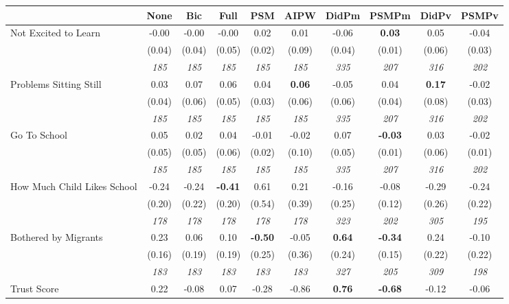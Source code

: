 \begin{tabular}{l c c c c c c c c c}
\toprule
 & None & Bic & Full & PSM & AIPW & DidPm & PSMPm & DidPv & PSMPv \\
\midrule
Not Excited to Learn & -0.00 & -0.00 & -0.00 & 0.02 & 0.01 & -0.06 & \textbf{0.03} & 0.05 & -0.04 \\
& (0.04) & (0.04) & (0.05) & (0.02) & (0.09) & (0.04) & (0.01) & (0.06) & (0.03) \\
& \textit{ 185 } & \textit{ 185 } & \textit{ 185 } & \textit{ 185 } & \textit{ 185 } & \textit{ 335 } & \textit{ 207 } & \textit{ 316 } & \textit{ 202 } \\
Problems Sitting Still & 0.03 & 0.07 & 0.06 & 0.04 & \textbf{0.06} & -0.05 & 0.04 & \textbf{ 0.17 } & -0.02 \\
& (0.04) & (0.06) & (0.05) & (0.03) & (0.06) & (0.06) & (0.04) & (0.08) & (0.03) \\
& \textit{ 185 } & \textit{ 185 } & \textit{ 185 } & \textit{ 185 } & \textit{ 185 } & \textit{ 335 } & \textit{ 207 } & \textit{ 316 } & \textit{ 202 } \\
Go To School & 0.05 & 0.02 & 0.04 & -0.01 & -0.02 & 0.07 & \textbf{-0.03} & 0.03 & -0.02 \\
& (0.05) & (0.05) & (0.06) & (0.02) & (0.10) & (0.05) & (0.01) & (0.06) & (0.01) \\
& \textit{ 185 } & \textit{ 185 } & \textit{ 185 } & \textit{ 185 } & \textit{ 185 } & \textit{ 335 } & \textit{ 207 } & \textit{ 316 } & \textit{ 202 } \\
How Much Child Likes School & -0.24 & -0.24 & \textbf{ -0.41 } & 0.61 & 0.21 & -0.16 & -0.08 & -0.29 & -0.24 \\
& (0.20) & (0.22) & (0.20) & (0.54) & (0.39) & (0.25) & (0.12) & (0.26) & (0.22) \\
& \textit{ 178 } & \textit{ 178 } & \textit{ 178 } & \textit{ 178 } & \textit{ 178 } & \textit{ 323 } & \textit{ 202 } & \textit{ 305 } & \textit{ 195 } \\
Bothered by Migrants & 0.23 & 0.06 & 0.10 & \textbf{-0.50} & -0.05 & \textbf{ 0.64 } & \textbf{-0.34} & 0.24 & -0.10 \\
& (0.16) & (0.19) & (0.19) & (0.25) & (0.36) & (0.24) & (0.15) & (0.22) & (0.22) \\
& \textit{ 183 } & \textit{ 183 } & \textit{ 183 } & \textit{ 183 } & \textit{ 183 } & \textit{ 327 } & \textit{ 205 } & \textit{ 309 } & \textit{ 198 } \\
Trust Score & 0.22 & -0.08 & 0.07 & -0.28 & -0.86 & \textbf{ 0.76 } & \textbf{-0.68} & -0.12 & -0.06 \\

\end{tabular}
